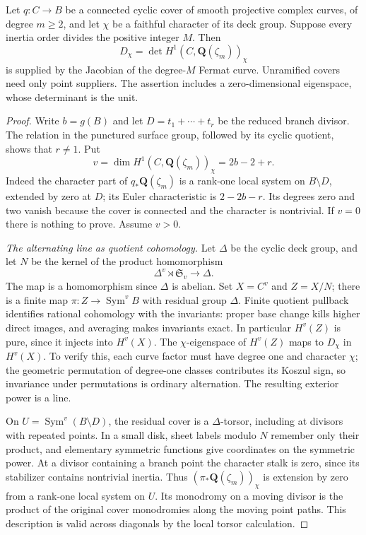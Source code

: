 \begin{theorem}
\label{HD-FS1}
Let $q:C\to B$ be a connected cyclic cover of smooth projective
complex curves, of degree $m\ge2$, and let $\chi$ be a faithful character
of its deck group.  Suppose every inertia order divides the positive
integer $M$.  Then
\[
 D_\chi=\det H^1(C,\mathbf Q(\zeta_m))_\chi
\]
is supplied by the Jacobian of the degree-$M$ Fermat curve.  Unramified
covers need only point suppliers.  The assertion includes a
zero-dimensional eigenspace, whose determinant is the unit.
\end{theorem}
\begin{proof}
Write $b=g(B)$ and let $D=t_1+\cdots+t_r$ be the reduced branch divisor.
The relation in the punctured surface group, followed by its cyclic
quotient, shows that $r\ne1$.  Put
\[
              v=\dim H^1(C,\mathbf Q(\zeta_m))_\chi=2b-2+r.
\]
Indeed the character part of $q_*\mathbf Q(\zeta_m)$ is a rank-one
local system on $B\setminus D$, extended by zero at $D$; its Euler
characteristic is $2-2b-r$.  Its degrees zero and two vanish because
the cover is connected and the character is nontrivial.  If $v=0$
there is nothing to prove.  Assume $v>0$.

\emph{The alternating line as quotient cohomology.}
Let $\Delta$ be the cyclic deck group, and let $N$ be the kernel of
the product homomorphism
\[
          \Delta^v\rtimes\mathfrak S_v\longrightarrow\Delta.
\]
The map is a homomorphism since $\Delta$ is abelian.  Set
$X=C^v$ and $Z=X/N$; there is a finite map
$\pi:Z\to\operatorname{Sym}^v B$ with residual group $\Delta$.
Finite quotient pullback identifies rational cohomology with the
invariants: proper base change kills higher direct images, and
averaging makes invariants exact.  In particular $H^v(Z)$ is pure,
since it injects into $H^v(X)$.
The $\chi$-eigenspace of $H^v(Z)$ maps to $D_\chi$ in $H^v(X)$.
To verify this, each curve factor must have degree one and character
$\chi$; the geometric permutation of degree-one classes contributes
its Koszul sign, so invariance under permutations is ordinary
alternation.  The resulting exterior power is a line.

On $U=\operatorname{Sym}^v(B\setminus D)$, the residual cover is a
$\Delta$-torsor, including at divisors with repeated points.  In a
small disk, sheet labels modulo $N$ remember only their product,
and elementary symmetric functions give coordinates on the symmetric
power.  At a divisor containing a branch point the character stalk
is zero, since its stabilizer contains nontrivial inertia.  Thus
$(\pi_*\mathbf Q(\zeta_m))_\chi$ is extension by zero from a
rank-one local system on $U$.  Its monodromy on a moving divisor
is the product of the original cover monodromies along the moving
point paths.  This description is valid across diagonals by the
local torsor calculation.


\end{proof}
